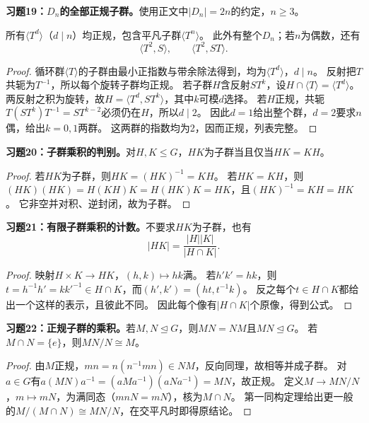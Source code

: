 \begin{problem}
\textbf{习题19：$D_n$的全部正规子群。}使用正文中$|D_n|=2n$的约定，$n\geq3$。
\end{problem}
\begin{solution}
所有$\langle T^d\rangle$（$d\mid n$）均正规，包含平凡子群$\langle T^n\rangle$。
此外有整个$D_n$；若$n$为偶数，还有
\[
\langle T^2,S\rangle,\qquad\langle T^2,ST\rangle.
\]
\end{solution}
\begin{proof}
循环群$\langle T\rangle$的子群由最小正指数与带余除法得到，均为$\langle T^d\rangle$，$d\mid n$。
反射把$T$共轭为$T^{-1}$，所以每个旋转子群均正规。
若子群$H$含反射$ST^k$，设$H\cap\langle T\rangle=\langle T^d\rangle$。
两反射之积为旋转，故$H=\langle T^d,ST^k\rangle$，其中$k$可模$d$选择。
若$H$正规，共轭$T(ST^k)T^{-1}=ST^{k-2}$必须仍在$H$，所以$d\mid2$。
因此$d=1$给出整个群，$d=2$要求$n$偶，给出$k=0,1$两群。
这两群的指数均为2，因而正规，列表完整。
\end{proof}

\begin{problem}
\textbf{习题20：子群乘积的判别。}对$H,K\leq G$，$HK$为子群当且仅当$HK=KH$。
\end{problem}
\begin{proof}
若$HK$为子群，则$HK=(HK)^{-1}=KH$。
若$HK=KH$，则$(HK)(HK)=H(KH)K=H(HK)K=HK$，且$(HK)^{-1}=KH=HK$。
它非空并对积、逆封闭，故为子群。
\end{proof}

\begin{problem}
\textbf{习题21：有限子群乘积的计数。}不要求$HK$为子群，也有
\[
|HK|=\frac{|H||K|}{|H\cap K|}.
\]
\end{problem}
\begin{proof}
映射$H\times K\to HK$，$(h,k)\mapsto hk$满。
若$h'k'=hk$，则$t=h^{-1}h'=kk'^{-1}\in H\cap K$，而$(h',k')=(ht,t^{-1}k)$。
反之每个$t\in H\cap K$都给出一个这样的表示，且彼此不同。
因此每个像有$|H\cap K|$个原像，得到公式。
\end{proof}

\begin{problem}
\textbf{习题22：正规子群的乘积。}若$M,N\trianglelefteq G$，则$MN=NM$且$MN\trianglelefteq G$。
若$M\cap N=\{e\}$，则$MN/N\cong M$。
\end{problem}
\begin{proof}
由$M$正规，$mn=n(n^{-1}mn)\in NM$，反向同理，故相等并成子群。
对$a\in G$有$a(MN)a^{-1}=(aMa^{-1})(aNa^{-1})=MN$，故正规。
定义$M\to MN/N$，$m\mapsto mN$，为满同态（$mnN=mN$），核为$M\cap N$。
第一同构定理给出更一般的$M/(M\cap N)\cong MN/N$，在交平凡时即得原结论。
\end{proof}

